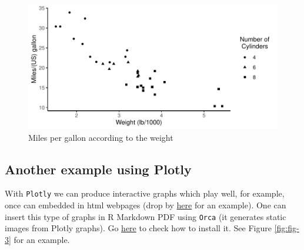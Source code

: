 \documentclass[
  12pt,
]{article}
\newenvironment{Shaded}{\begin{snugshade}}{\end{snugshade}}
\newcommand{\AttributeTok}[1]{\textcolor[rgb]{0.77,0.63,0.00}{#1}}
\newcommand{\CommentTok}[1]{\textcolor[rgb]{0.56,0.35,0.01}{\textit{#1}}}
\newcommand{\FunctionTok}[1]{\textcolor[rgb]{0.00,0.00,0.00}{#1}}
\newcommand{\NormalTok}[1]{#1}
\newcommand{\OtherTok}[1]{\textcolor[rgb]{0.56,0.35,0.01}{#1}}
\newcommand{\SpecialCharTok}[1]{\textcolor[rgb]{0.00,0.00,0.00}{#1}}
\newcommand{\StringTok}[1]{\textcolor[rgb]{0.31,0.60,0.02}{#1}}
\begin{document}
\begin{Shaded}
\end{Shaded}

\begin{figure}[h]

{\centering \includegraphics{articleCustomerDropoutMembership_files/figure-latex/Fig-2-1} 

}

\caption{Miles per gallon according to the weight}\label{fig:Fig-2}
\end{figure}

\hypertarget{another-example-using-plotly}{%
\subsection{Another example using Plotly}\label{another-example-using-plotly}}

With \texttt{Plotly} we can produce interactive graphs which play well, for example,
once can embedded in html webpages (drop by
\href{https://paulcbauer.shinyapps.io/visualizing-causal-scenarios/}{here} for an
example). One can insert this type of graphs in R Markdown PDF using \texttt{Orca} (it
generates static images from Plotly graphs). Go
\href{https://github.com/plotly/orca\#installation}{here} to check how to install it.
See Figure \ref{fig:fig-3} for an example.
\end{document}
